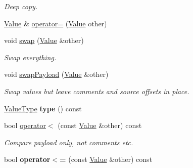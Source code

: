 \begin{DoxyCompactItemize}
\begin{DoxyCompactList}\small\item\em Deep copy. \end{DoxyCompactList}\item 
\hyperlink{classJson_1_1Value}{Value} \& \hyperlink{classJson_1_1Value_a795acb28772da4c5d85ae8f4af36c69f}{operator=} (\hyperlink{classJson_1_1Value}{Value} other)
\item 
void \hyperlink{classJson_1_1Value_aab841120d78e296e1bc06a373345e822}{swap} (\hyperlink{classJson_1_1Value}{Value} \&other)\hypertarget{classJson_1_1Value_aab841120d78e296e1bc06a373345e822}{}\label{classJson_1_1Value_aab841120d78e296e1bc06a373345e822}

\begin{DoxyCompactList}\small\item\em Swap everything. \end{DoxyCompactList}\item 
void \hyperlink{classJson_1_1Value_a5263476047f20e2fc6de470e4de34fe5}{swap\+Payload} (\hyperlink{classJson_1_1Value}{Value} \&other)\hypertarget{classJson_1_1Value_a5263476047f20e2fc6de470e4de34fe5}{}\label{classJson_1_1Value_a5263476047f20e2fc6de470e4de34fe5}

\begin{DoxyCompactList}\small\item\em Swap values but leave comments and source offsets in place. \end{DoxyCompactList}\item 
\hyperlink{namespaceJson_a7d654b75c16a57007925868e38212b4e}{Value\+Type} {\bfseries type} () const \hypertarget{classJson_1_1Value_a695ef31fad36b4712918b3ff80158479}{}\label{classJson_1_1Value_a695ef31fad36b4712918b3ff80158479}

\item 
bool \hyperlink{classJson_1_1Value_af0ad8aa027575c3277296458f3fb7b0a}{operator$<$} (const \hyperlink{classJson_1_1Value}{Value} \&other) const \hypertarget{classJson_1_1Value_af0ad8aa027575c3277296458f3fb7b0a}{}\label{classJson_1_1Value_af0ad8aa027575c3277296458f3fb7b0a}

\begin{DoxyCompactList}\small\item\em Compare payload only, not comments etc. \end{DoxyCompactList}\item 
bool {\bfseries operator$<$=} (const \hyperlink{classJson_1_1Value}{Value} \&other) const \hypertarget{classJson_1_1Value_afb99dd3628fe44244b32007f9b4f369a}{}\label{classJson_1_1Value_afb99dd3628fe44244b32007f9b4f369a}


\end{DoxyCompactItemize}
